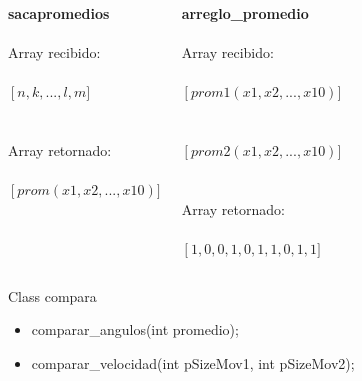 \documentclass{beamer}
\begin{document}
\begin{frame}

\begin{columns}[c] 

\textbf{sacapromedios}\\~\\

Array recibido:\\~\\
$\left[n,k,...,l,m\right.]$\\~\\~\\

Array retornado:\\~\\
$\left[prom(x1,x2,...,x10)\right.]$


\textbf{arreglo\_promedio}\\~\\

Array recibido:\\~\\

$\left[prom1(x1,x2,...,x10)\right.]$\\~\\~\\
$\left[prom2(x1,x2,...,x10)\right.]$\\~\\~\\
Array retornado:\\~\\

$\left[1,0,0,1,0,1,1,0,1,1\right.]$

\end{columns}


\end{frame}



\begin{frame}

Class compara
 
\begin{itemize}

\item comparar\_angulos(int promedio);
\item comparar\_velocidad(int pSizeMov1, int pSizeMov2);
\end{itemize}

\end{frame}
\end{document}
